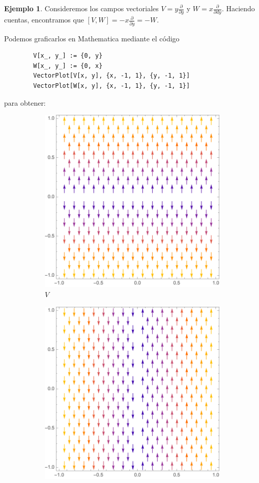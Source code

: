 \documentclass[spanish]{book}
\theoremstyle{definition}
\newtheorem*{ejem}{Ejemplo}
\begin{document}
\begin{ejem}
	Consideremos los campos vectoriales $V=y\frac{\partial}{\partial y}$ y $W=x\frac{\partial}{\partial dy}$. Haciendo cuentas, encontramos que  $[V,W]=-x\frac{\partial }{\partial y}=-W$.
	
	Podemos graficarlos en Mathematica mediante el código
	\begin{verbatim}
		V[x_, y_] := {0, y}
		W[x_, y_] := {0, x}
		VectorPlot[V[x, y], {x, -1, 1}, {y, -1, 1}]
		VectorPlot[W[x, y], {x, -1, 1}, {y, -1, 1}]
	\end{verbatim}
	para obtener:
	\begin{figure}[H]
		\begin{subfigure}{0.5\linewidth}
			\centering
			\includegraphics[width=0.9\linewidth]{fig6}
			\caption*{$V$}
		\end{subfigure}
		\begin{subfigure}{0.5\linewidth}
			\centering
			\includegraphics[width=0.9\linewidth]{fig7}

\end{subfigure}
\end{figure}
\end{ejem}
\end{document}
